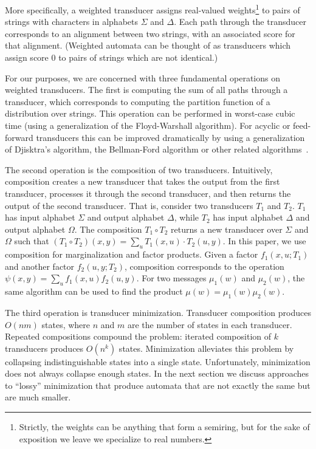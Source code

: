\documentclass[11pt,a4paper]{article}
\begin{document}
More specifically, a weighted transducer assigns real-valued
weights\footnote{Strictly, the weights can be anything that form a
semiring, but for the sake of exposition we leave we specialize
to real numbers.} to pairs of strings with characters in alphabets $\Sigma$
and $\Delta$. Each path through the transducer corresponds to an
alignment between two strings, with an associated score for that
alignment. (Weighted automata can be thought of as transducers which
assign score 0 to pairs of strings which are not identical.)

For our purposes, we are concerned with three fundamental operations
on weighted transducers. The first is computing the sum of all paths
through a transducer, which corresponds to computing the partition
function of a distribution over strings. This operation can be
performed in worst-case cubic time (using a generalization of the
Floyd-Warshall algorithm).  For acyclic or feed-forward transducers
this can be improved dramatically by using a generalization of
Djisktra's algorithm, the Bellman-Ford algorithm or other related
algorithms~\cite{mohri09weighted}.

The second operation is the composition of two transducers.
Intuitively, composition creates a new transducer that takes the
output from the first transducer, processes it through the second
transducer, and then returns the output of the second transducer.
That is, consider two transducers $T_1$ and $T_2$. $T_1$ has input
alphabet $\Sigma$ and output alphabet $\Delta$, while $T_2$ has
input alphabet $\Delta$ and output alphabet $\Omega$. The composition
$T_1 \circ T_2$ returns a new transducer over $\Sigma$ and $\Omega$
such that $(T_1 \circ T_2)(x,y) = \sum_{u} T_1(x,u)\cdot T_2(u,y)$.
In this paper, we use composition for marginalization and factor
products. Given a factor $f_1(x,u;T_1)$ and another factor $f_2(u,y;T_2)$,
composition corresponds to the operation $\psi(x,y) = \sum_u f_1(x,u)
f_2(u,y)$. For two messages $\mu_1(w)$ and $\mu_2(w)$, the same
algorithm can be used to find the product $\mu(w) = \mu_1(w)\mu_2(w)$.

The third operation is transducer minimization. Transducer composition
produces $O(nm)$ states, where $n$ and $m$ are the number of states
in each transducer. Repeated compositions compound the problem:
iterated composition of $k$ transducers produces $O(n^k)$ states.
Minimization alleviates this problem by collapsing indistinguishable
states into a single state. Unfortunately, minimization does not
always collapse enough states. In the next section we discuss approaches
to ``lossy'' minimization that produce automata that are not exactly
the same but are much smaller.
\end{document}
